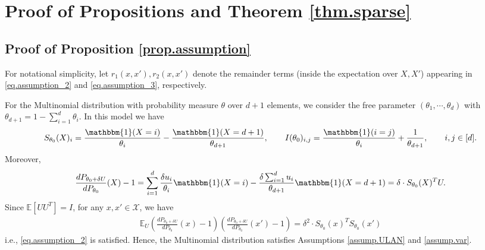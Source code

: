 \documentclass[final,12pt]{colt2018} %
\def \bE {\mathbb{E}}
\newcommand{\calX}{{\mathcal{X}}}
\begin{document}

\section{Proof of Propositions and Theorem \ref{thm.sparse}}

\subsection{Proof of Proposition \ref{prop.assumption}}
For notational simplicity, let $r_1(x,x'), r_2(x,x')$ denote the remainder terms (inside the expectation over $X,X'$) appearing in \eqref{eq.assumption_2} and \eqref{eq.assumption_3}, respectively. 

For the Multinomial distribution with probability measure $\theta$ over $d+1$ elements, we consider the free parameter $(\theta_1,\cdots,\theta_d)$ with $\theta_{d+1} = 1-\sum_{i=1}^d \theta_i$. In this model we have
\begin{align*}
S_{\theta_0}(X)_i = \frac{\mathbbm{1}(X=i)}{\theta_i} - \frac{\mathbbm{1}(X=d+1)}{\theta_{d+1}}, \qquad I(\theta_0)_{i,j} = \frac{\mathbbm{1}(i=j)}{\theta_i} + \frac{1}{\theta_{d+1}}, \qquad i,j\in [d].
\end{align*}
Moreover, 
\begin{align*}
\frac{dP_{\theta_0+\delta U}}{dP_{\theta_0}}(X) - 1 = \sum_{i=1}^d \frac{\delta u_i}{\theta_i}\mathbbm{1}(X=i) - \frac{\delta\sum_{i=1}^d u_i}{\theta_{d+1}}\mathbbm{1}(X=d+1) = \delta \cdot S_{\theta_0}(X)^TU. 
\end{align*}
Since $\bE[UU^T]=I$, for any $x,x'\in\calX$, we have 
\begin{align*}
\bE_U \left( \frac{dP_{\theta_0+\delta U}}{dP_{\theta_0}}(x) - 1 \right)\left( \frac{dP_{\theta_0+\delta U}}{dP_{\theta_0}}(x') - 1 \right) = \delta^2 \cdot S_{\theta_0}(x)^TS_{\theta_0}(x')
\end{align*}
i.e., \eqref{eq.assumption_2} is satisfied. Hence, the Multinomial distribution satisfies Assumptions \ref{assump.ULAN} and \ref{assump.var}. 
\end{document}
